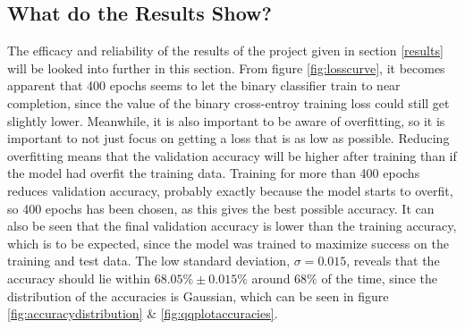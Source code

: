 \documentclass[11pt, fleqn, titlepage]{article}
\begin{document}
	\subsection{What do the Results Show?}\label{discussionOfResults}
	The efficacy and reliability of the results of the project given in section \ref{results} will be looked into further in this section. From figure \ref{fig:losscurve}, it becomes apparent that 400 epochs seems to let the binary classifier train to near completion, since the value of the binary cross-entroy training loss could still get slightly lower. Meanwhile, it is also important to be aware of overfitting, so it is important to not just focus on getting a loss that is as low as possible. Reducing overfitting means that the validation accuracy will be higher after training than if the model had overfit the training data. Training for more than 400 epochs reduces validation accuracy, probably exactly because the model starts to overfit, so 400 epochs has been chosen, as this gives the best possible accuracy. It can also be seen that the final validation accuracy is lower than the training accuracy, which is to be expected, since the model was trained to maximize success on the training and test data. The low standard deviation, $ \sigma=0.015 $, reveals that the accuracy should lie within $68.05\% \pm 0.015\%$ around $68\%$ of the time, since the distribution of the accuracies is Gaussian, which can be seen in figure \ref{fig:accuracydistribution} \& \ref{fig:qqplotaccuracies}.
	
\end{document}
